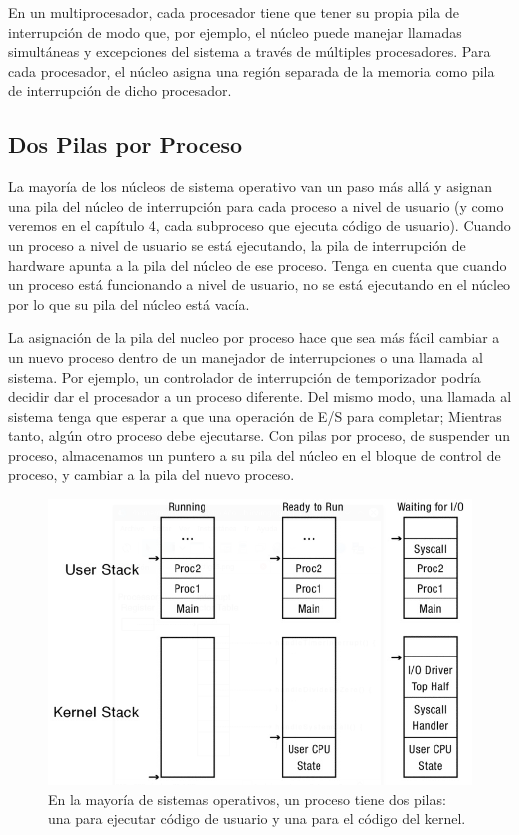 \documentclass[10pt]{book}
\begin{document}
En un multiprocesador, cada procesador tiene que tener su propia pila de interrupción de modo que, por ejemplo, el núcleo puede manejar llamadas simultáneas y excepciones del sistema a través de múltiples procesadores. Para cada procesador, el núcleo asigna una región separada de la memoria como pila de interrupción de dicho procesador.

\subsection{Dos Pilas por Proceso}
La mayoría de los núcleos de sistema operativo van un paso más allá y asignan una pila del núcleo de interrupción para cada proceso a nivel de usuario (y como veremos en el capítulo 4, cada subproceso que ejecuta código de usuario). Cuando un proceso a nivel de usuario se está ejecutando, la pila de interrupción de hardware apunta a la pila del núcleo de ese proceso. Tenga en cuenta que cuando un proceso está funcionando a nivel de usuario, no se está ejecutando en el núcleo por lo que su pila del núcleo está vacía.

La asignación de la pila del nucleo por proceso hace que sea más fácil cambiar a un nuevo proceso dentro de un manejador de interrupciones o una llamada al sistema. Por ejemplo, un controlador de interrupción de temporizador podría decidir dar el procesador a un proceso diferente. Del mismo modo, una llamada al sistema tenga que esperar a que una operación de E/S para completar; Mientras tanto, algún otro proceso debe ejecutarse. Con pilas por proceso, de suspender un proceso, almacenamos un puntero a su pila del núcleo en el bloque de control de proceso, y cambiar a la pila del nuevo proceso.

\begin{figure}[tbhp]
\centerline{\includegraphics[scale=0.55]{img/fig06}}
\caption{En la mayoría de sistemas operativos, un proceso tiene dos pilas: una para ejecutar código de usuario y una para el código del kernel.}
\label{fig06}
\end{figure}
\end{document}

